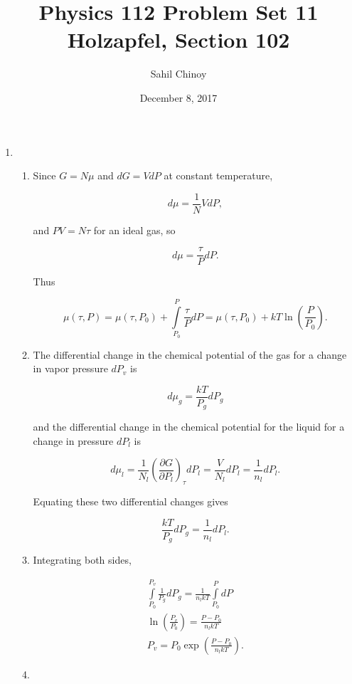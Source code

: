 \documentclass{article}
\title{Physics 112 Problem Set 11 \\ \large{Holzapfel, Section 102}}
\author{Sahil Chinoy}
\date{December 8, 2017}
\begin{document}
\maketitle{}

\begin{enumerate}

	\item

	\begin{enumerate}

		\item

		Since $G = N\mu$ and $dG = VdP$ at constant temperature,

		$$d \mu = \frac{1}{N} V dP,$$

		and $PV = N \tau$ for an ideal gas, so 

		$$d \mu = \frac{\tau}{P} dP.$$

		Thus

		$$\mu(\tau, P) = \mu(\tau, P_0) + \int \limits_{P_0}^P \frac{\tau}{P} dP = \mu(\tau, P_0)  + kT \ln \left( \frac{P}{P_0} \right).$$

		\item

		The differential change in the chemical potential of the gas for a change in vapor pressure $dP_v$ is

		$$d\mu_g = \frac{kT}{P_g} dP_g$$

		and the differential change in the chemical potential for the liquid for a change in pressure $dP_l$ is

		$$d\mu_l = \frac{1}{N_l} \left( \frac{\partial G}{\partial P_l} \right)_\tau dP_l = \frac{V}{N_l} dP_l = \frac{1}{n_l}dP_l.$$

		Equating these two differential changes gives

		$$\frac{kT}{P_g} dP_g = \frac{1}{n_l}dP_l.$$

		\item

		Integrating both sides,

		\begin{gather*}
		\int \limits_{P_0}^{P_v} \frac{1}{P_g} dP_g = \frac{1}{n_l kT} \int \limits_{P_0}^P dP \\
		\ln\left(\frac{P_v}{P_0} \right) = \frac{P - P_0}{n_lkT} \\
		P_v = P_0 \exp \left( \frac{P - P_0}{n_lkT} \right).
		\end{gather*}

		\item


\end{enumerate}
\end{enumerate}
\end{document}
